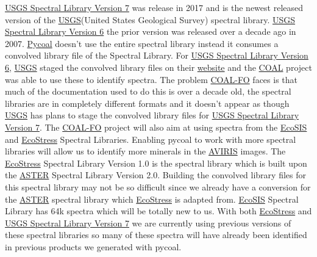 \documentclass[a4paper,12pt]{article}
\begin{document}
\href{https://crustal.usgs.gov/speclab/QueryAll07a.php}{USGS Spectral Library Version 7} was release in 2017 and is the newest released version of the \href{https://www.usgs.gov/}{USGS}(United States Geological Survey) spectral library. \href{https://speclab.cr.usgs.gov/spectral.lib06/ds231/index.html}{USGS Spectral Library Version 6} the prior version was released over a decade ago in 2007. \href{https://github.com/capstone-coal/pycoal}{Pycoal} doesn’t use the entire spectral library instead it consumes a convolved library file of the Spectral Library. For \href{https://speclab.cr.usgs.gov/spectral.lib06/ds231/index.html}{USGS Spectral Library Version 6}, \href{https://www.usgs.gov/}{USGS} staged the convolved library files on their \href{ftp://ftpext.cr.usgs.gov/pub/cr/co/denver/speclab/pub/spectral.library/splib06.library/Convolved.libraries/}{website} and the \href{https://capstone-coal.github.io/}{COAL} project was able to use these to identify spectra. The problem \href{https://capstone-coal.github.io/team}{COAL-FO} faces is that much of the documentation used to do this is over a decade old, the spectral libraries are in completely different formats and it doesn’t appear as though \href{https://www.usgs.gov/}{USGS} has plans to stage the convolved library files for \href{https://crustal.usgs.gov/speclab/QueryAll07a.php}{USGS Spectral Library Version 7}.\newline
\newline
The \href{https://capstone-coal.github.io/team}{COAL-FO} project will also aim at using spectra from the \href{https://ecosis.org/}{EcoSIS} and \href{https://speclib.jpl.nasa.gov/}{EcoStress} Spectral Libraries. Enabling pycoal to work with more spectral libraries will allow us to identify more minerals in the \href{https://aviris.jpl.nasa.gov/}{AVIRIS} images. The \href{https://speclib.jpl.nasa.gov/}{EcoStress} Spectral Library Version 1.0 is the spectral library which is built upon the \href{https://speclib.jpl.nasa.gov/downloads/2009-Baldridge.pdf}{ASTER} Spectral Library Version 2.0. Building the convolved library files for this spectral library may not be so difficult since we already have a conversion for the \href{https://speclib.jpl.nasa.gov/downloads/2009-Baldridge.pdf}{ASTER} spectral library which \href{https://speclib.jpl.nasa.gov/}{EcoStress} is adapted from.
\href{https://ecosis.org/}{EcoSIS} Spectral Library has 64k spectra which will be totally new to us. With both \href{https://speclib.jpl.nasa.gov/}{EcoStress} and \href{https://crustal.usgs.gov/speclab/QueryAll07a.php}{USGS Spectral Library Version 7} we are currently using previous versions of these spectral libraries so many of these spectra will have already been identified in previous products we generated with pycoal. \newline
\end{document}
